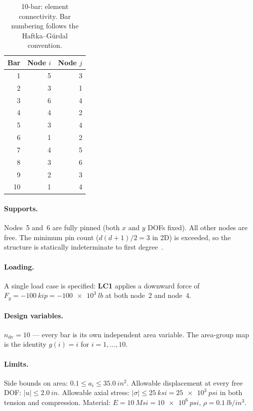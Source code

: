 \begin{table}[h]
  \centering
  \small
  \caption{10-bar: element connectivity. Bar numbering follows
    the Haftka--G\"urdal convention.}
  \label{tab:geom:10bar:conn}
  \begin{tabular}{rrr}
  \toprule
  Bar & Node $i$ & Node $j$ \\
  \midrule
  1 & 5 & 3 \\ 2 & 3 & 1 \\ 3 & 6 & 4 \\ 4 & 4 & 2 \\ 5 & 3 & 4 \\
  6 & 1 & 2 \\ 7 & 4 & 5 \\ 8 & 3 & 6 \\ 9 & 2 & 3 \\ 10 & 1 & 4 \\
  \bottomrule
  \end{tabular}
\end{table}

\paragraph{Supports.} Nodes~5 and~6 are fully pinned (both $x$ and
$y$ DOFs fixed). All other nodes are free. The minimum pin count
($d(d+1)/2=3$ in 2D) is exceeded, so the structure is statically
indeterminate to first degree~\cite{subramanian2008}.

\paragraph{Loading.} A single load case is specified:
\textbf{LC1} applies a downward force of
$F_y=-\SI{100}{kip}=-\SI{100e3}{lb}$ at both node~2 and node~4.

\paragraph{Design variables.} $n_{\mathrm{dv}}=10$ --- every bar
is its own independent area variable. The area-group map is the
identity $g(i)=i$ for $i=1,\dotsc,10$.

\paragraph{Limits.} Side bounds on area:
$\num{0.1}\le a_i\le\SI{35.0}{in^2}$. Allowable displacement at
every free DOF: $|u|\le\SI{2.0}{in}$. Allowable axial stress:
$|\sigma|\le\SI{25}{ksi}=\SI{25e3}{psi}$ in both tension and
compression. Material: $E=\SI{10}{Msi}=\SI{10e6}{psi}$,
$\rho=\SI{0.1}{lb/in^3}$.

